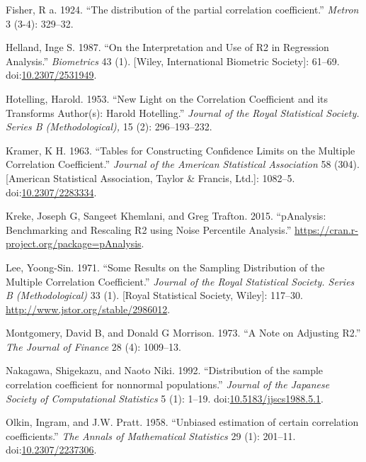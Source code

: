 \documentclass[]{article}
\begin{document}
\hypertarget{ref-Fisher1924}{}
Fisher, R a. 1924. ``The distribution of the partial correlation
coefficient.'' \emph{Metron} 3 (3-4): 329--32.

\hypertarget{ref-Helland1987}{}
Helland, Inge S. 1987. ``On the Interpretation and Use of R2 in
Regression Analysis.'' \emph{Biometrics} 43 (1). {[}Wiley, International
Biometric Society{]}: 61--69.
doi:\href{https://doi.org/10.2307/2531949}{10.2307/2531949}.

\hypertarget{ref-Hotelling1953}{}
Hotelling, Harold. 1953. ``New Light on the Correlation Coefficient and
its Transforms Author(s): Harold Hotelling.'' \emph{Journal of the Royal
Statistical Society. Series B (Methodological),} 15 (2): 296--193--232.

\hypertarget{ref-Kramer1963}{}
Kramer, K H. 1963. ``Tables for Constructing Confidence Limits on the
Multiple Correlation Coefficient.'' \emph{Journal of the American
Statistical Association} 58 (304). {[}American Statistical Association,
Taylor \& Francis, Ltd.{]}: 1082--5.
doi:\href{https://doi.org/10.2307/2283334}{10.2307/2283334}.

\hypertarget{ref-Kreke2015}{}
Kreke, Joseph G, Sangeet Khemlani, and Greg Trafton. 2015. ``pAnalysis:
Benchmarking and Rescaling R2 using Noise Percentile Analysis.''
\url{https://cran.r-project.org/package=pAnalysis}.

\hypertarget{ref-Lee1971}{}
Lee, Yoong-Sin. 1971. ``Some Results on the Sampling Distribution of the
Multiple Correlation Coefficient.'' \emph{Journal of the Royal
Statistical Society. Series B (Methodological)} 33 (1). {[}Royal
Statistical Society, Wiley{]}: 117--30.
\url{http://www.jstor.org/stable/2986012}.

\hypertarget{ref-Montgomery1973}{}
Montgomery, David B, and Donald G Morrison. 1973. ``A Note on Adjusting
R2.'' \emph{The Journal of Finance} 28 (4): 1009--13.

\hypertarget{ref-Nakagawa1992}{}
Nakagawa, Shigekazu, and Naoto Niki. 1992. ``Distribution of the sample
correlation coefficient for nonnormal populations.'' \emph{Journal of
the Japanese Society of Computational Statistics} 5 (1): 1--19.
doi:\href{https://doi.org/10.5183/jjscs1988.5.1}{10.5183/jjscs1988.5.1}.

\hypertarget{ref-Olkin1958}{}
Olkin, Ingram, and J.W. Pratt. 1958. ``Unbiased estimation of certain
correlation coefficients.'' \emph{The Annals of Mathematical Statistics}
29 (1): 201--11.
doi:\href{https://doi.org/10.2307/2237306}{10.2307/2237306}.
\end{document}
